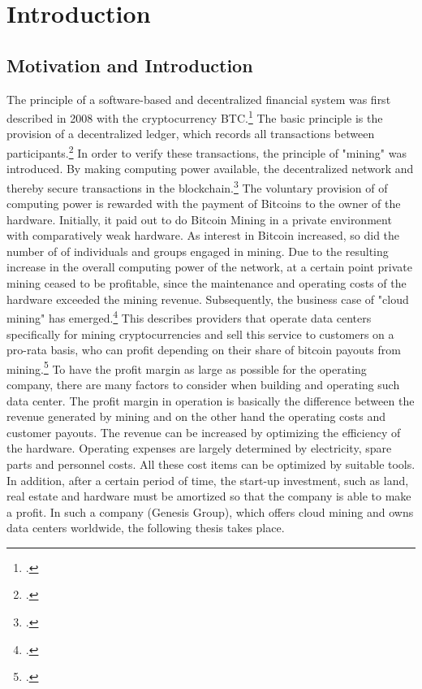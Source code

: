 \section{Introduction} \label{toc:einleitung}

\subsection{Motivation and Introduction} \label{toc:motivation}

The principle of a software-based and decentralized financial system was first described in 2008 with the cryptocurrency \ac{BTC}.\footcite[Cf.][]{nakamoto2008bitcoin}
The basic principle is the provision of a decentralized ledger,
which records all transactions between participants.\footcite[Cf.][]{badertscher2017bitcoin} In order to verify these transactions,
the principle of "mining" was introduced. By making computing power available, the decentralized 
network and thereby secure transactions in the blockchain.\footcite[Cf.][]{kroll2013economics} The voluntary provision of
of computing power is rewarded with the payment of Bitcoins to the owner of the hardware. Initially, it paid out to do Bitcoin
Mining in a private environment with comparatively weak hardware. As interest in Bitcoin increased, so did the number of
of individuals and groups engaged in mining. Due to the resulting increase in the overall computing power of the network, at a certain point
private mining ceased to be profitable, since the maintenance and operating costs of the hardware
exceeded the mining revenue. Subsequently, the business case of "cloud mining" has emerged.\footcite[Cf.][]{taylor2017evolution} This describes
providers that operate data centers specifically for mining cryptocurrencies and sell this service to customers on a pro-rata basis,
who can profit depending on their share of bitcoin payouts from mining.\footcite[Cf.][chap. 3.4.5]{bhaskar2015bitcoin}
To have the profit margin as large as possible for the operating company, there are many factors to consider when building and operating
such data center. The profit margin in operation is basically the difference between the revenue generated by mining
and on the other hand the operating costs and customer payouts. The revenue can be increased by optimizing the efficiency of the hardware.
Operating expenses are largely determined by electricity, spare parts and personnel costs. All these cost items
can be optimized by suitable tools. In addition, after a certain period of time, the start-up investment, such as land, real estate and hardware
must be amortized so that the company is able to make a profit. In such a company (Genesis Group),
which offers cloud mining and owns data centers worldwide, the following thesis takes place. 

